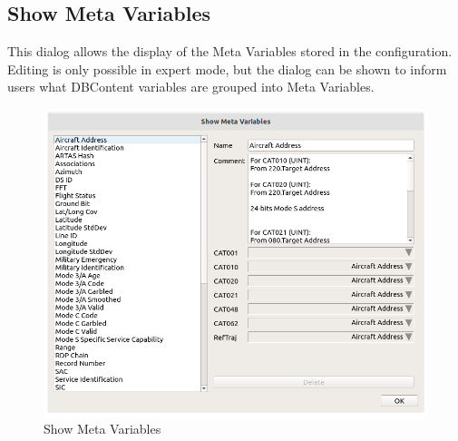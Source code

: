\subsection{Show Meta Variables}
\label{sec:configure_meta_vars}

This dialog allows the display of the Meta Variables stored in the configuration. 
Editing is only possible in expert mode, but the dialog can be shown to inform users what DBContent variables are grouped into Meta Variables. \\

\begin{figure}[H]
  \center
    \hspace*{-0.5cm}
    \includegraphics[width=15cm]{figures/configure_meta_vars.png}
  \caption{Show Meta Variables}
\end{figure}
